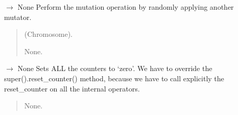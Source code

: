 \documentclass[letterpaper,10pt,english]{sphinxmanual}
\begin{document}
\begin{fulllineitems}
\begin{fulllineitems}
\begin{quote}
\begin{description}
\end{description}\end{quote}

\end{fulllineitems}


\begin{fulllineitems}
\label{\detokenize{pygenalgo.operators.mutation:pygenalgo.operators.mutation.meta_mutator.MetaMutator.mutate}}
\pysigstartsignatures
\pysiglinewithargsret
{}
{}
{{ $\rightarrow$ None}}
\pysigstopsignatures
\sphinxAtStartPar
Perform the mutation operation by randomly applying another mutator.
\begin{quote}\begin{description}
\sphinxAtStartPar
{} \textendash{} (Chromosome).

\sphinxAtStartPar
None.

\end{description}\end{quote}

\end{fulllineitems}


\begin{fulllineitems}
\label{\detokenize{pygenalgo.operators.mutation:pygenalgo.operators.mutation.meta_mutator.MetaMutator.reset_counter}}
\pysigstartsignatures
\pysiglinewithargsret
{}
{}
{{ $\rightarrow$ None}}
\pysigstopsignatures
\sphinxAtStartPar
Sets ALL the counters to ‘zero’. We have to override the super().reset\_counter()
method, because we have to call explicitly the reset\_counter on all the internal
operators.
\begin{quote}\begin{description}
\sphinxAtStartPar
None.

\end{description}\end{quote}

\end{fulllineitems}


\end{fulllineitems}
\end{document}

